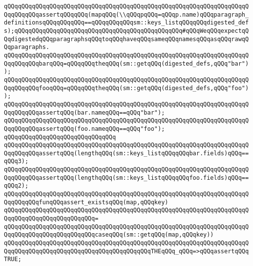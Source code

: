 \newline
\verb|qQQqqQQqqQQqqQQqqQQqqQQqqQQqqQQqqQQqqQQqqQQqqQQqqQQqqQQqqQQqqQQqqQQqqQQqqQQqqQQqassertqQQqqQQq(mapqQQq(\\qQQqpqQQq=qQQqp.name)qQQqparagraph_definitionsqQQqqQQqqQQq==qQQqqQQqqQQqsm::keys_listqQQqqQQqdigested_defs);qQQqqQQqqQQqqQQqqQQqqQQqqQQqqQQqqQQqqQQqqQQqqQQq#qQQqWeqQQqexpectqQQqdigestedqQQqparagraphsqQQqtoqQQqhaveqQQqsameqQQqnamesqQQqasqQQqrawqQQqparagraphs.|\newline
\newline
\verb|qQQqqQQqqQQqqQQqqQQqqQQqqQQqqQQqqQQqqQQqqQQqqQQqqQQqqQQqqQQqqQQqqQQqqQQqqQQqqQQqbarqQQq=qQQqqQQqtheqQQq(sm::getqQQq(digested_defs,qQQq"bar"));|\newline
\verb|qQQqqQQqqQQqqQQqqQQqqQQqqQQqqQQqqQQqqQQqqQQqqQQqqQQqqQQqqQQqqQQqqQQqqQQqqQQqqQQqfooqQQq=qQQqqQQqtheqQQq(sm::getqQQq(digested_defs,qQQq"foo"));|\newline
\newline
\verb|qQQqqQQqqQQqqQQqqQQqqQQqqQQqqQQqqQQqqQQqqQQqqQQqqQQqqQQqqQQqqQQqqQQqqQQqqQQqqQQqassertqQQq(bar.nameqQQq==qQQq"bar");|\newline
\verb|qQQqqQQqqQQqqQQqqQQqqQQqqQQqqQQqqQQqqQQqqQQqqQQqqQQqqQQqqQQqqQQqqQQqqQQqqQQqqQQqassertqQQq(foo.nameqQQq==qQQq"foo");|\newline
\verb|qQQqqQQqqQQqqQQqqQQqqQQqqQQqqQQq|\newline
\verb|qQQqqQQqqQQqqQQqqQQqqQQqqQQqqQQqqQQqqQQqqQQqqQQqqQQqqQQqqQQqqQQqqQQqqQQqqQQqqQQqassertqQQq(lengthqQQq(sm::keys_listqQQqqQQqbar.fields)qQQq==qQQq3);|\newline
\verb|qQQqqQQqqQQqqQQqqQQqqQQqqQQqqQQqqQQqqQQqqQQqqQQqqQQqqQQqqQQqqQQqqQQqqQQqqQQqqQQqassertqQQq(lengthqQQq(sm::keys_listqQQqqQQqfoo.fields)qQQq==qQQq2);|\newline
\newline
\verb|qQQqqQQqqQQqqQQqqQQqqQQqqQQqqQQqqQQqqQQqqQQqqQQqqQQqqQQqqQQqqQQqqQQqqQQqqQQqqQQqfunqQQqassert_existsqQQq(map,qQQqkey)|\newline
\verb|qQQqqQQqqQQqqQQqqQQqqQQqqQQqqQQqqQQqqQQqqQQqqQQqqQQqqQQqqQQqqQQqqQQqqQQqqQQqqQQqqQQqqQQqqQQqqQQq=|\newline
\verb|qQQqqQQqqQQqqQQqqQQqqQQqqQQqqQQqqQQqqQQqqQQqqQQqqQQqqQQqqQQqqQQqqQQqqQQqqQQqqQQqqQQqqQQqqQQqqQQqcaseqQQq(sm::getqQQq(map,qQQqkey))|\newline
\verb|qQQqqQQqqQQqqQQqqQQqqQQqqQQqqQQqqQQqqQQqqQQqqQQqqQQqqQQqqQQqqQQqqQQqqQQqqQQqqQQqqQQqqQQqqQQqqQQqqQQqqQQqqQQqqQQqTHEqQQq_qQQq=>qQQqassertqQQqTRUE;|\newline
